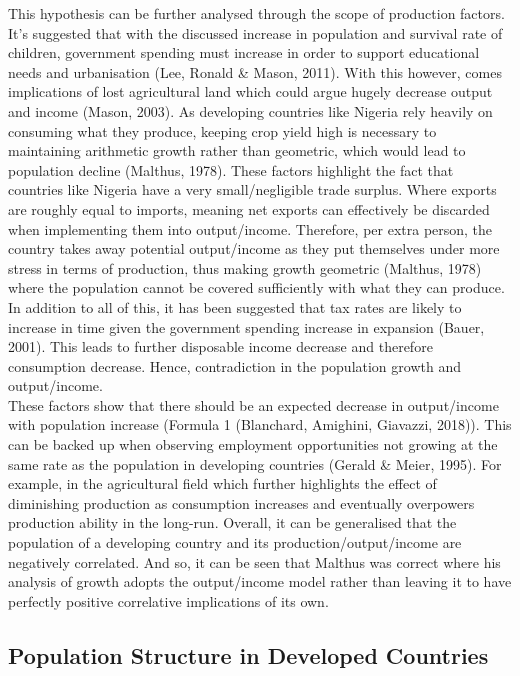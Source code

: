 \documentclass[11pt, english]{article}
\begin{document}
	This hypothesis can be further analysed through the scope of production factors. It's suggested that with the discussed increase in population and survival rate of children, government spending must increase in order to support educational needs and urbanisation (Lee, Ronald \& Mason, 2011). With this however, comes implications of lost agricultural land which could argue hugely decrease output and income (Mason, 2003). As developing countries like Nigeria rely heavily on consuming what they produce, keeping crop yield high is necessary to maintaining arithmetic growth rather than geometric, which would lead to population decline (Malthus, 1978). These factors highlight the fact that countries like Nigeria have a very small/negligible trade surplus. Where exports are roughly equal to imports, meaning net exports can effectively be discarded when implementing them into output/income. Therefore, per extra person, the country takes away potential output/income as they put themselves under more stress in terms of production, thus making growth geometric (Malthus, 1978) where the population cannot be covered sufficiently with what they can produce. In addition to all of this, it has been suggested that tax rates are likely to increase in time given the government spending increase in expansion (Bauer, 2001). This leads to further disposable income decrease and therefore consumption decrease. Hence, contradiction in the population growth and output/income.\\

	These factors show that there should be an expected decrease in output/income with population increase (Formula 1 (Blanchard, Amighini, Giavazzi, 2018)). This can be backed up when observing employment opportunities not growing at the same rate as the population in developing countries (Gerald \& Meier, 1995). For example, in the agricultural field which further highlights the effect of diminishing production as consumption increases and eventually overpowers production ability in the long-run. Overall, it can be generalised that the population of a developing country and its production/output/income are negatively correlated. And so, it can be seen that Malthus was correct where his analysis of growth adopts the output/income model rather than leaving it to have perfectly positive correlative implications of its own.

	\newpage

	\subsection{Population Structure in Developed Countries}
\end{document}
